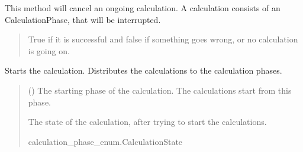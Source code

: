 \documentclass[letterpaper,10pt,english]{sphinxmanual}
\begin{document}
\begin{fulllineitems}
\begin{fulllineitems}
\label{\detokenize{apidoc/src.osm_configurator.model.project.calculation:src.osm_configurator.model.project.calculation.calculation_manager.CalculationManager.cancel_calculation}}
\pysigstartsignatures
{}
\pysigstopsignatures
\sphinxAtStartPar
This method will cancel an ongoing calculation.
A calculation consists of an CalculationPhase, that will be interrupted.
\begin{quote}\begin{description}
\sphinxAtStartPar
True if it is successful and false if something goes wrong, or no calculation is going on.

\sphinxAtStartPar
{}

\end{description}\end{quote}

\end{fulllineitems}


\begin{fulllineitems}
\label{\detokenize{apidoc/src.osm_configurator.model.project.calculation:src.osm_configurator.model.project.calculation.calculation_manager.CalculationManager.start_calculation}}
\pysigstartsignatures
{}
\pysigstopsignatures
\sphinxAtStartPar
Starts the calculation.
Distributes the calculations to the calculation phases.
\begin{quote}\begin{description}
\sphinxAtStartPar
{} ({\hyperref[\detokenize{apidoc/src.osm_configurator.model.project.calculation:src.osm_configurator.model.project.calculation.calculation_phase_enum.CalculationPhase}]{}}) \textendash{} The starting phase of the calculation. The calculations start from this phase.

\sphinxAtStartPar
The state of the calculation, after trying to start the calculations.

\sphinxAtStartPar
calculation\_phase\_enum.CalculationState

\end{description}\end{quote}

\end{fulllineitems}


\end{fulllineitems}
\end{document}
